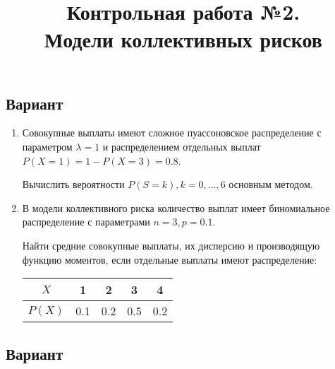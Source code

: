 \documentclass[14pt, a4paper]{article}
\title{
	Контрольная работа №2. \\
	Модели коллективных рисков
}
\date{}
\begin{document}
	
	
	\newpage
	\begin{center}
		\section{Вариант}
	\end{center}
	
	\begin{enumerate}
		\item 
		Совокупные выплаты имеют сложное пуассоновское распределение с параметром $\lambda = 1$ и распределением отдельных выплат $P(X=1) = 1 - P(X=3) = 0.8$.
		
		Вычислить вероятности $P(S=k), k = 0, ..., 6$ основным методом.
		
		\item 
		В модели коллективного риска количество выплат имеет биномиальное распределение с параметрами $n=3, p=0.1$.
		
		Найти средние совокупные выплаты, их дисперсию и производящую функцию моментов, если отдельные выплаты имеют распределение:
		
		\begin{center}
			\begin{tabular}{ |c|c|c|c|c|}
				\hline
				$X$ & 1 & 2 & 3 & 4 \\
				\hline
				$P(X)$ & 0.1 & 0.2 & 0.5 & 0.2 \\
				\hline
			\end{tabular}
		\end{center}
	\end{enumerate}


	\newpage
	\begin{center}
		\section{Вариант}
	\end{center}
	
\end{document}
